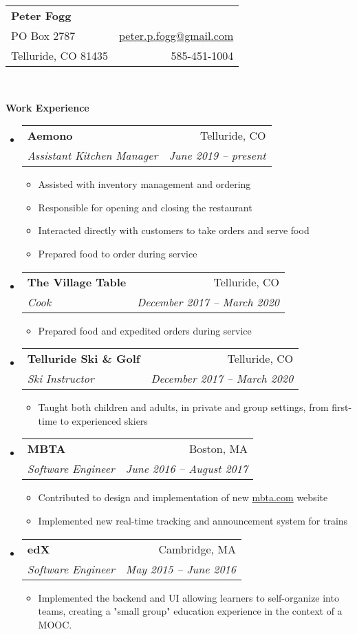 \documentclass[letterpaper,11pt]{article}
\makeatletter
\newcommand{\resitem}[1]{\item #1 \vspace{-2pt}}
\newcommand{\resheading}[1]{{\large{\begin{minipage}{\textwidth}{\textbf{#1\vphantom{p\^{E}}}}\end{minipage}}}}
\newcommand{\ressubheading}[4]{
  \begin{tabular*}{6.5in}{l@{\extracolsep{\fill}}r}
    \textbf{#1} & #2 \\
    \textit{#3} & \textit{#4} \\
  \end{tabular*}\vspace{-6pt}}
\makeatother
\begin{document}
\newcommand{\mywebheader}{
  \begin{tabular*}{7in}{l@{\extracolsep{\fill}}r}
    \textbf{\LARGE Peter Fogg} & \\
    PO Box 2787 &  \href{mailto:peter.p.fogg@gmail.com}{peter.p.fogg@gmail.com} \\
    Telluride, CO 81435 & 585-451-1004
  \end{tabular*}
  \\
  \vspace{0.1in}}

\mywebheader

\resheading{Work Experience}
\begin{itemize}
\item
  \ressubheading{Aemono}{Telluride, CO}{Assistant Kitchen Manager}{June 2019 -- present}
  \begin{itemize}
    \resitem{Assisted with inventory management and ordering}
    \resitem{Responsible for opening and closing the restaurant}
    \resitem{Interacted directly with customers to take orders and serve food}
    \resitem{Prepared food to order during service}
  \end{itemize}
\item
  \ressubheading{The Village Table}{Telluride, CO}{Cook}{December 2017 -- March 2020}
  \begin{itemize}
    \resitem{Prepared food and expedited orders during service}
  \end{itemize}
\item
  \ressubheading{Telluride Ski \& Golf}{Telluride, CO}{Ski Instructor}{December 2017 -- March 2020}
  \begin{itemize}
    \resitem{Taught both children and adults, in private and group settings, from first-time to experienced skiers}
  \end{itemize}
\item
  \ressubheading{MBTA}{Boston, MA}{Software Engineer}{June 2016 -- August 2017}
  \begin{itemize}
    \resitem{Contributed to design and implementation of new \href{https://mbta.com/}{mbta.com} website}
    \resitem{Implemented new real-time tracking and announcement system for trains}
  \end{itemize}
\item
  \ressubheading{edX}{Cambridge, MA}{Software Engineer}{May 2015 -- June 2016}
  \begin{itemize}
    \resitem{Implemented the backend and UI allowing learners to self-organize into teams, creating a "small group" education experience in the context of a MOOC.}

\end{itemize}
\end{itemize}
\end{document}
